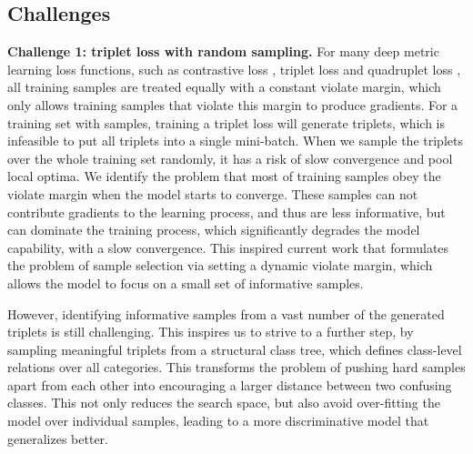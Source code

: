 \documentclass[runningheads]{llncs}
\begin{document}
\subsection{Challenges}
\noindent\textbf{Challenge 1: triplet loss with random sampling.}
For many deep metric learning loss functions, such as contrastive loss \cite{hadsell2006dimensionality}, triplet loss \cite{schroff2015facenet} and  quadruplet loss \cite{Chen_2017_CVPR}, all training samples are treated equally with a constant violate margin, which only allows training samples that violate this margin to produce gradients. For a training set  with  samples, training a triplet loss will generate  triplets, which is infeasible to put all triplets into a single mini-batch. When we sample the triplets over the whole training set randomly, it has a risk of slow convergence and pool local optima.
 We identify the problem that most of training samples obey the violate margin when the model starts to converge. These samples can not contribute gradients to the learning process, and thus are less informative, but can dominate the training process, which significantly degrades the model capability, with a slow convergence. This inspired current work that formulates the problem of sample selection via setting a dynamic violate margin, which allows the model to focus on a small set of informative samples.

 However, identifying informative samples from a vast number of the generated triplets is still challenging. This inspires us to strive to a further step, by sampling meaningful triplets from a structural class tree, which defines class-level relations over all categories. This transforms the problem of pushing hard samples apart from each other into encouraging a larger distance between two confusing classes. This not only reduces the search space, but also avoid over-fitting the model over individual samples, leading to a more discriminative model that generalizes better.  \\
\end{document}
